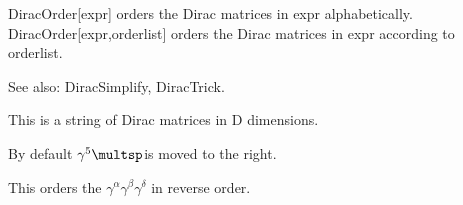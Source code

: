 DiracOrder[expr] orders the Dirac matrices in expr alphabetically. DiracOrder[expr,orderlist] orders the Dirac matrices in expr according
  to orderlist.

See also:  DiracSimplify, DiracTrick.






This is a string of Dirac matrices in D dimensions.







By default \({{\gamma }^5}\multsp \)is moved to the right.









This orders the \({{\gamma }^{\alpha }}{{\gamma }^{\beta }}{{\gamma }^{\delta }}\) in reverse order.

